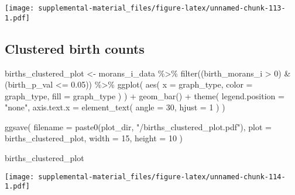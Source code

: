 \documentclass[
]{book}
\newenvironment{Shaded}{\begin{snugshade}}{\end{snugshade}}
\newcommand{\AttributeTok}[1]{\textcolor[rgb]{0.77,0.63,0.00}{#1}}
\newcommand{\DecValTok}[1]{\textcolor[rgb]{0.00,0.00,0.81}{#1}}
\newcommand{\FloatTok}[1]{\textcolor[rgb]{0.00,0.00,0.81}{#1}}
\newcommand{\FunctionTok}[1]{\textcolor[rgb]{0.00,0.00,0.00}{#1}}
\newcommand{\NormalTok}[1]{#1}
\newcommand{\OtherTok}[1]{\textcolor[rgb]{0.56,0.35,0.01}{#1}}
\newcommand{\SpecialCharTok}[1]{\textcolor[rgb]{0.00,0.00,0.00}{#1}}
\newcommand{\StringTok}[1]{\textcolor[rgb]{0.31,0.60,0.02}{#1}}
\begin{document}
\texttt{[image: supplemental-material\_files/figure-latex/unnamed-chunk-113-1.pdf]}

\hypertarget{clustered-birth-counts}{%
\subsection{Clustered birth counts}\label{clustered-birth-counts}}

\begin{Shaded}
\begin{Highlighting}[]
\NormalTok{births\_clustered\_plot }\OtherTok{\textless{}{-}}\NormalTok{ morans\_i\_data }\SpecialCharTok{\%\textgreater{}\%}
  \FunctionTok{filter}\NormalTok{((birth\_morans\_i }\SpecialCharTok{\textgreater{}} \DecValTok{0}\NormalTok{) }\SpecialCharTok{\&}\NormalTok{ (birth\_p\_val }\SpecialCharTok{\textless{}=} \FloatTok{0.05}\NormalTok{)) }\SpecialCharTok{\%\textgreater{}\%}
  \FunctionTok{ggplot}\NormalTok{(}
    \FunctionTok{aes}\NormalTok{(}
      \AttributeTok{x =}\NormalTok{ graph\_type,}
      \AttributeTok{color =}\NormalTok{ graph\_type,}
      \AttributeTok{fill =}\NormalTok{ graph\_type}
\NormalTok{    )}
\NormalTok{  ) }\SpecialCharTok{+}
  \FunctionTok{geom\_bar}\NormalTok{() }\SpecialCharTok{+}
  \FunctionTok{theme}\NormalTok{(}
    \AttributeTok{legend.position =} \StringTok{"none"}\NormalTok{,}
    \AttributeTok{axis.text.x =} \FunctionTok{element\_text}\NormalTok{(}
      \AttributeTok{angle =} \DecValTok{30}\NormalTok{,}
      \AttributeTok{hjust =} \DecValTok{1}
\NormalTok{    )}
\NormalTok{  )}

\FunctionTok{ggsave}\NormalTok{(}
  \AttributeTok{filename =} \FunctionTok{paste0}\NormalTok{(plot\_dir, }\StringTok{"/births\_clustered\_plot.pdf"}\NormalTok{),}
  \AttributeTok{plot =}\NormalTok{ births\_clustered\_plot,}
  \AttributeTok{width =} \DecValTok{15}\NormalTok{,}
  \AttributeTok{height =} \DecValTok{10}
\NormalTok{)}

\NormalTok{births\_clustered\_plot}
\end{Highlighting}
\end{Shaded}

\texttt{[image: supplemental-material\_files/figure-latex/unnamed-chunk-114-1.pdf]}
\end{document}
